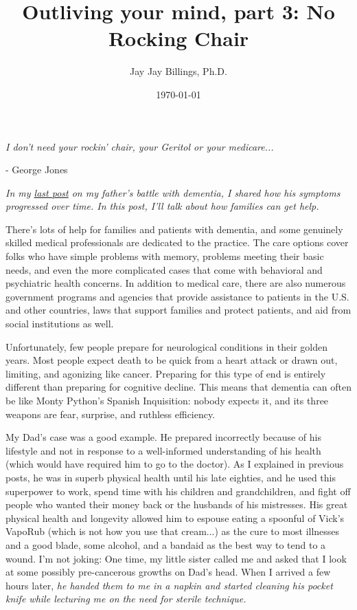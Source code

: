 \documentclass{article}
\title{Outliving your mind, part 3: No Rocking Chair}
\author{Jay Jay Billings, Ph.D.}
\date{\today}
\begin{document}
\maketitle

\begin{center}
\textit{I don't need your rockin' chair, your Geritol or your medicare...}

\hspace*{\fill} - George Jones
\end{center}

\textit{In my \href{https://jayjaybillings.com/2023/07/06/outliving-your-mind-part-1-the-secret/}{last post} on my father's battle with dementia, I shared how his symptoms progressed over time. In this post, I'll talk about how families can get help.}

There's lots of help for families and patients with dementia, and some genuinely skilled medical professionals are dedicated to the practice. The care options cover folks who have simple problems with memory, problems meeting their basic needs, and even the more complicated cases that come with behavioral and psychiatric health concerns. In addition to medical care, there are also numerous government programs and agencies that provide assistance to patients in the U.S. and other countries, laws that support families and protect patients, and aid from social institutions as well. 

Unfortunately, few people prepare for neurological conditions in their golden years. Most people expect death to be quick from a heart attack or drawn out, limiting, and agonizing like cancer. Preparing for this type of end is entirely different than preparing for cognitive decline. This means that dementia can often be like Monty Python's Spanish Inquisition: nobody expects it, and its three weapons are fear, surprise, and ruthless efficiency.

My Dad's case was a good example. He prepared incorrectly because of his lifestyle and not in response to a well-informed understanding of his health (which would have required him to go to the doctor). As I explained in previous posts, he was in superb physical health until his late eighties, and he used this superpower to work, spend time with his children and grandchildren, and fight off people who wanted their money back or the husbands of his mistresses. His great physical health and longevity allowed him to espouse eating a spoonful of Vick's VapoRub (which is not how you use that cream...) as the cure to most illnesses and a good blade, some alcohol, and a bandaid as the best way to tend to a wound. I'm not joking: One time, my little sister called me and asked that I look at some possibly pre-cancerous growths on Dad's head. When I arrived a few hours later, \textit{he handed them to me in a napkin and started cleaning his pocket knife while lecturing me on the need for sterile technique.} 
\end{document}

